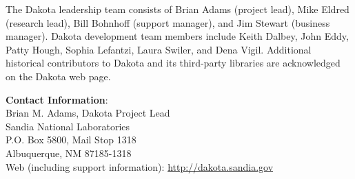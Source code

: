 The Dakota leadership team consists of Brian Adams (project lead),
Mike Eldred (research lead), Bill Bohnhoff (support manager), and Jim
Stewart (business manager).  Dakota development team members include
Keith Dalbey, John Eddy, Patty Hough, Sophia Lefantzi, Laura Swiler,
and Dena Vigil.  Additional historical contributors to Dakota and its
third-party libraries are acknowledged on the Dakota web page.

\textbf{Contact Information}:\\
{\small Brian M. Adams, Dakota Project Lead}\\
{\small Sandia National Laboratories}\\
{\small P.O. Box 5800, Mail Stop 1318}\\
{\small Albuquerque, NM 87185-1318}\\
{\small Web (including support information): \url{http://dakota.sandia.gov}}
